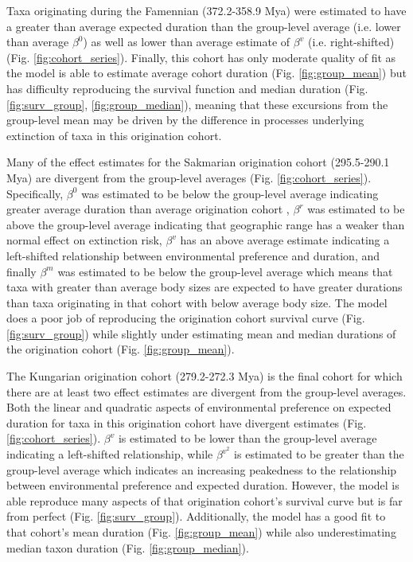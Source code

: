 \documentclass[11pt]{article}
\begin{document}
Taxa originating during the Famennian (372.2-358.9 Mya) were estimated to have a greater than average expected duration than the group-level average (i.e. lower than average \(\beta^{0}\)) as well as lower than average estimate of \(\beta^{v}\) (i.e. right-shifted) (Fig. \ref{fig:cohort_series}). Finally, this cohort has only moderate quality of fit as the model is able to estimate average cohort duration (Fig. \ref{fig:group_mean}) but has difficulty reproducing the survival function and median duration (Fig. \ref{fig:surv_group}, \ref{fig:group_median}), meaning that these excursions from the group-level mean may be driven by the difference in processes underlying extinction of taxa in this origination cohort.

Many of the effect estimates for the Sakmarian origination cohort (295.5-290.1 Mya) are divergent from the group-level averages (Fig. \ref{fig:cohort_series}). Specifically, \(\beta^{0}\) was estimated to be below the group-level average indicating greater average duration than average origination cohort , \(\beta^{r}\) was estimated to be above the group-level average indicating that geographic range has a weaker than normal effect on extinction risk, \(\beta^{v}\) has an above average estimate indicating a left-shifted relationship between environmental preference and duration, and finally \(\beta^{m}\) was estimated to be below the group-level average which means that taxa with greater than average body sizes are expected to have greater durations than taxa originating in that cohort with below average body size. The model does a poor job of reproducing the origination cohort survival curve (Fig. \ref{fig:surv_group}) while slightly under estimating mean and median durations of the origination cohort (Fig. \ref{fig:group_mean}).

The Kungarian origination cohort (279.2-272.3 Mya) is the final cohort for which there are at least two effect estimates are divergent from the group-level averages. Both the linear and quadratic aspects of environmental preference on expected duration for taxa in this origination cohort have divergent estimates (Fig. \ref{fig:cohort_series}). \(\beta^{v}\) is estimated to be lower than the group-level average indicating a left-shifted relationship, while \(\beta^{v^{2}}\) is estimated to be greater than the group-level average which indicates an increasing peakedness to the relationship between environmental preference and expected duration. However, the model is able reproduce many aspects of that origination cohort's survival curve but is far from perfect (Fig. \ref{fig:surv_group}). Additionally, the model has a good fit to that cohort's mean duration (Fig. \ref{fig:group_mean}) while also underestimating median taxon duration (Fig. \ref{fig:group_median}).
\end{document}
